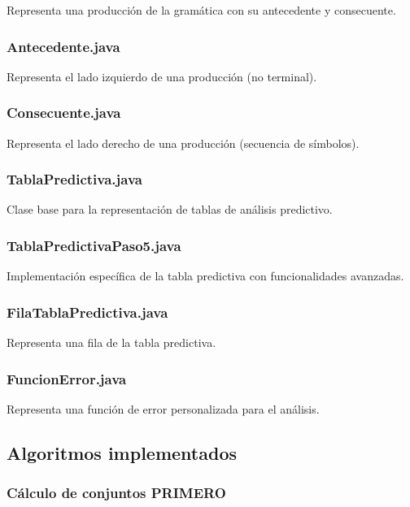 Representa una producción de la gramática con su antecedente y consecuente.

\subsubsection{Antecedente.java}

Representa el lado izquierdo de una producción (no terminal).

\subsubsection{Consecuente.java}

Representa el lado derecho de una producción (secuencia de símbolos).

\subsubsection{TablaPredictiva.java}

Clase base para la representación de tablas de análisis predictivo.

\subsubsection{TablaPredictivaPaso5.java}

Implementación específica de la tabla predictiva con funcionalidades avanzadas.

\subsubsection{FilaTablaPredictiva.java}

Representa una fila de la tabla predictiva.

\subsubsection{FuncionError.java}

Representa una función de error personalizada para el análisis.

\subsection{Algoritmos implementados}

\subsubsection{Cálculo de conjuntos PRIMERO}


